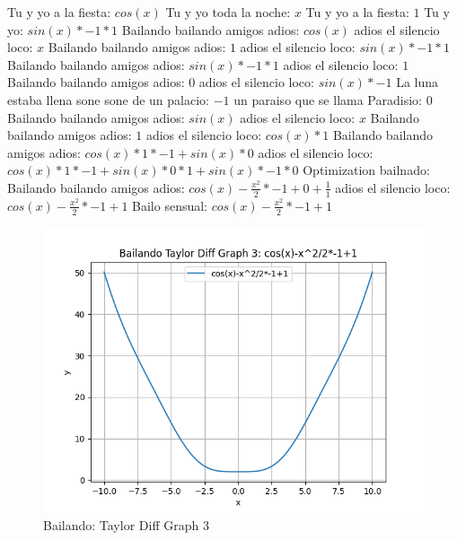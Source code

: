 \documentclass{article}
\begin{document}
Tu y yo a la fiesta: $cos(x)$  \newline Tu y yo toda la noche: $x$ Tu y yo a la fiesta: $1$  \newline Tu y yo: $sin(x)*-1*1$ Bailando bailando amigos adios: $cos(x)$  \newline adios el silencio loco: $x$ Bailando bailando amigos adios: $1$  \newline adios el silencio loco: $sin(x)*-1*1$ Bailando bailando amigos adios: $sin(x)*-1*1$ adios el silencio loco: $1$ Bailando bailando amigos adios: $0$  \newline adios el silencio loco: $sin(x)*-1$ La luna estaba llena sone sone de un palacio: $-1$ un paraiso que se llama Paradisio: $0$  \newline Bailando bailando amigos adios: $sin(x)$  \newline adios el silencio loco: $x$ Bailando bailando amigos adios: $1$  \newline adios el silencio loco: $cos(x)*1$ Bailando bailando amigos adios: $cos(x)*1*-1+sin(x)*0$ adios el silencio loco: ${cos(x)*1*-1+sin(x)*0}*1+sin(x)*-1*0$  \newline \newline Optimization bailnado: \newline Bailando bailando amigos adios: $cos(x)-\frac{x^2}{2}*-1+0+\frac{1}{1}$  \newline adios el silencio loco: $cos(x)-\frac{x^2}{2}*-1+1$  \newline Bailo sensual: $cos(x)-\frac{x^2}{2}*-1+1$  \newline \begin{figure}
\centering
\includegraphics[width=0.8\linewidth]{Bailando Taylor Diff Graph 3.png}
\caption{Bailando: Taylor Diff Graph 3}
\label{fig:my_image}
\end{figure}
\end{document}
